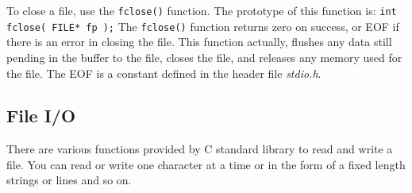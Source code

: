 \documentclass[11pt,a4paper]{article}
\begin{document}
To close a file, use the \texttt{fclose()} function. The prototype of this function is: \lstinline!int fclose( FILE* fp );! The \texttt{fclose()} function returns zero on success, or EOF if there is an error in closing the file. This function actually, flushes any data still pending in the buffer to the file, closes the file, and releases any memory used for the file. The EOF is a constant defined in the header file \emph{stdio.h}.

\subsection*{File I/O}
There are various functions provided by C standard library to read and write a file. You can read or write one character at a time or in the form of a fixed length strings or lines and so on.
\end{document}
